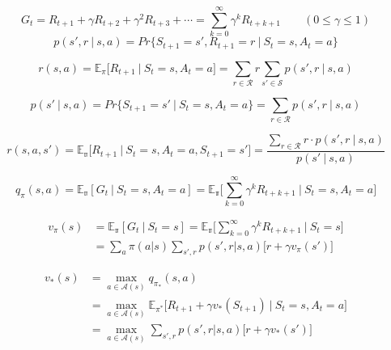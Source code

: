 \documentclass{article}
\begin{document}
\begin{equation}
\tag{3.2}  G_t = R_{t+1} + \gamma R_{t+2} + \gamma^2 R_{t+3} + \cdots = \sum_{k=0}^\infty \gamma^k R_{t+k+1} \qquad (0 \leq \gamma \leq 1)
\end{equation}
\begin{equation*}
\tag{3.6}  p(s',r\:|\:s,a) = Pr\bigl\{S_{t+1} = s', R_{t+1} = r \:\big|\: S_t = s, A_t = a\bigr\}
\end{equation*}

\begin{equation*}
\tag{3.7}  r(s,a) = \mathbb{E}_\pi\bigl[R_{t+1} \:\big|\: S_t = s, A_t = a\bigr] = \sum_{r\in\mathcal{R}}{r}\sum_{s'\in\mathcal{S}}{p(s',r\:|\:s,a)}
\end{equation*}

\begin{equation*}
\tag{3.8}  p(s'\:|\:s,a) = Pr\bigl\{S_{t+1} = s' \:\big|\: S_t = s, A_t = a\bigr\} = \sum_{r\in\mathcal{R}}{p(s',r\:|\:s,a)}
\end{equation*}

\begin{equation*}
\tag{3.9}  r(s,a,s') = \mathbb{E_\pi}\bigl[R_{t+1}\:\big|\:S_t=s,A_t=a,S_{t+1}=s'\bigr]=\frac{\sum_{r\in\mathcal{R}}{r\cdot{}p(s',r\:|\:s,a)}}{p(s'\:|\:s,a)}
\end{equation*}

\begin{equation*}
  \tag{3.11}  q_{\pi}(s,a) = \mathbb{E_\pi}[G_t \:|\: S_t=s,A_t=a] = \mathbb{E_\pi}\biggl[\sum_{k=0}^{\infty} \gamma^k R_{t+k+1}\:\bigg\vert\:S_t=s,A_t=a\biggr]
\end{equation*}

\begin{align*}
  v_{\pi}(s) &= \mathbb{E_\pi}[G_t \:|\: S_t=s] = \mathbb{E_\pi}\biggl[\sum_{k=0}^{\infty}\gamma^kR_{t+k+1}\:\bigg\vert\:S_t=s\biggr]\\
\tag{3.12}  &= \sum_a \pi(a|s) \sum_{s',r}p(s',r|s,a)\bigl[r+\gamma v_{\pi}(s')\bigl]
\end{align*}

\begin{align*}
  v_{\ast}(s) &= \max_{a\in\mathcal{A}(s)} q_{\pi_{\ast}}(s,a)\\
\tag{3.16}   &= \max_{a\in\mathcal{A}(s)} \mathbb{E}_{\pi^\ast} \bigl[R_{t+1} + \gamma v_\ast(S_{t+1}) \:\big|\: S_t=s, A_t=a \bigr]\\
\tag{3.17}   &= \max_{a\in\mathcal{A}(s)} \sum_{s',r}p(s',r|s,a)\bigl[r+\gamma v_{\ast}(s')\bigr]
\end{align*}
\end{document}
